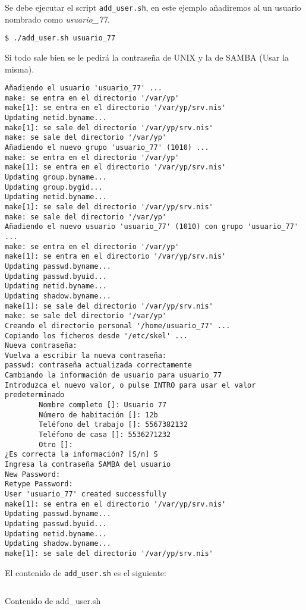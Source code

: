 \documentclass[../main.tex]{subfiles}
\begin{document}
Se debe ejecutar el script \texttt{add\_user.sh},
en este ejemplo añadiremos al un usuario nombrado como
\textit{usuario\_77}.

\begin{listing}[H]
\begin{verbatim}
$ ./add_user.sh usuario_77
\end{verbatim}
\end{listing}

Si todo sale bien se le pedirá la contraseña de UNIX y
la de \Gls{SAMBA} (Usar la misma).

\begin{verbatim}
Añadiendo el usuario 'usuario_77' ...
make: se entra en el directorio '/var/yp'
make[1]: se entra en el directorio '/var/yp/srv.nis'
Updating netid.byname...
make[1]: se sale del directorio '/var/yp/srv.nis'
make: se sale del directorio '/var/yp'
Añadiendo el nuevo grupo 'usuario_77' (1010) ...
make: se entra en el directorio '/var/yp'
make[1]: se entra en el directorio '/var/yp/srv.nis'
Updating group.byname...
Updating group.bygid...
Updating netid.byname...
make[1]: se sale del directorio '/var/yp/srv.nis'
make: se sale del directorio '/var/yp'
Añadiendo el nuevo usuario 'usuario_77' (1010) con grupo 'usuario_77' ...
make: se entra en el directorio '/var/yp'
make[1]: se entra en el directorio '/var/yp/srv.nis'
Updating passwd.byname...
Updating passwd.byuid...
Updating netid.byname...
Updating shadow.byname...
make[1]: se sale del directorio '/var/yp/srv.nis'
make: se sale del directorio '/var/yp'
Creando el directorio personal '/home/usuario_77' ...
Copiando los ficheros desde '/etc/skel' ...
Nueva contraseña:
Vuelva a escribir la nueva contraseña:
passwd: contraseña actualizada correctamente
Cambiando la información de usuario para usuario_77
Introduzca el nuevo valor, o pulse INTRO para usar el valor predeterminado
        Nombre completo []: Usuario 77
        Número de habitación []: 12b
        Teléfono del trabajo []: 5567382132
        Teléfono de casa []: 5536271232
        Otro []:
¿Es correcta la información? [S/n] S
Ingresa la contraseña SAMBA del usuario
New Password:
Retype Password:
User 'usuario_77' created successfully
make[1]: se entra en el directorio '/var/yp/srv.nis'
Updating passwd.byname...
Updating passwd.byuid...
Updating netid.byname...
Updating shadow.byname...
make[1]: se sale del directorio '/var/yp/srv.nis'
\end{verbatim}

El contenido de \texttt{add\_user.sh} es el siguiente:
\begin{listing}[H]
\inputminted{bash}{../configs/add_user.sh}
\caption{Contenido de add\_user.sh}
\label{listing:adduser.sh}
\end{listing}
\end{document}

